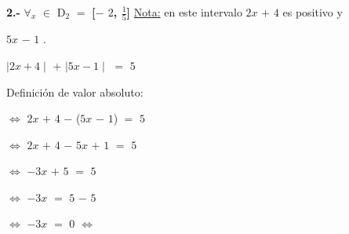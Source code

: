 \documentclass[12pt]{article}
\newenvironment{MyColorPar}[1]{%
    \leavevmode\color{#1}\ignorespaces%
}{%
}%
\begin{document}


{\bfseries{2.-}} \hspace{0.2cm} $\forall$$_{x}$ $\in$ D$_{2}$ $=$ {\textcolor{wisteria}{{\bfseries{[$-$ $2${\Large{,}} {\Large{$\frac{1}{5}$}}]}}}}  \vspace{0.5cm}
 \hspace{0.5cm} {\textcolor{palatinateblue}{{\underline{Nota:}} en este intervalo $2x$ $+$ $4$ es {\textcolor{verde_manzana}{positivo}} y}} 

{\textcolor{palatinateblue}{$5x$ $-$ $1$}} {}.  
\begin{center}
    
$\mid 2x + 4 \mid$ $+$ $\mid 5x - 1\mid$ $=$ $5$ 
\end{center}

\begin{MyColorPar}{palatinateblue}
Definición de valor absoluto:
\end{MyColorPar}

\hspace{3cm} $\Longleftrightarrow$ \hspace{0.2cm} $2x$ $+$ $4$ $-$ ($5x$ $-$ $1$) $=$ $5$ \vspace{0.2cm}

\hspace{3cm} $\Longleftrightarrow$ \hspace{0.2cm} $2x$ $+$ $4$ $-$ $5x$ $+$ $1$ $=$ $5$ \vspace{0.2cm}

\hspace{3cm} $\Longleftrightarrow$ \hspace{0.2cm} $-3x$ $+$ $5$ $=$ $5$ \vspace{0.2cm}

\hspace{3cm} $\Longleftrightarrow$ \hspace{0.2cm} $-3x$ $=$ $5$ $-$ $5$  \vspace{0.2cm}

\hspace{3cm} $\Longleftrightarrow$ \hspace{0.2cm} $-3x$ $=$ $0$ \hspace{0.2cm} $\Longleftrightarrow$ \hspace{0.2cm}    \vspace{0.2cm}
\end{document}
